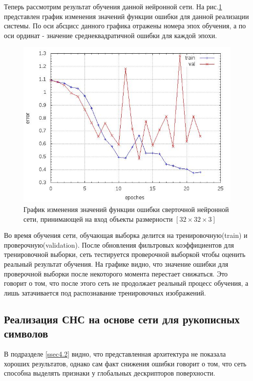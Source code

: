 \documentclass[14pt]{article}
\numberwithin{figure}{section}
\numberwithin{equation}{section}
\begin{document}
Теперь рассмотрим результат обучения данной нейронной сети. На рис.\ref{ris:10} представлен график изменения значений функции ошибки для данной реализации системы. По оси абсцисс данного графика отражены номера эпох обучения, а по оси ординат - значение среднеквадратичной ошибки для каждой эпохи.

\begin{figure}[h]
   \begin{center}
       \includegraphics[scale=0.6] {10.JPG}
       \caption{График изменения значений функции ошибки сверточной нейронной сети, принимающей на вход объекты размерности $[32 \times 32 \times 3]$}
       \label{ris:10}
   \end{center}
\end{figure}

Во время обучения сети, обучающая выборка делится на тренировочную(train) и проверочную(validation). После обновления фильтровых коэффициентов для тренировочной выборки, сеть тестируется проверочной выборкой чтобы оценить реальный результат обучения. На графике видно, что значение ошибки для проверочной выборки после некоторого момента перестает снижаться. Это говорит о том, что после этого сеть не продолжает реальный процесс обучения, а лишь затачивается под распознавание тренировочных изображений.

\subsection{Реализация СНС на основе сети для рукописных символов}\label{ssec4.3}

В подразделе \ref{ssec4.2} видно, что представленная архитектура не показала хороших результатов, однако сам факт снижения ошибки говорит о том, что сеть способна выделять признаки у глобальных дескрипторов поверхности.
\end{document}
